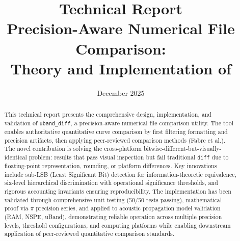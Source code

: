 \documentclass[11pt,letterpaper]{article}
\title{
    \textbf{Technical Report}\\
    \large Precision-Aware Numerical File Comparison:\\
    Theory and Implementation of \ubdiff{}
}
\author{}
\date{December 2025}
\newcommand{\ubdiff}{\texttt{uband\_diff}}
\begin{document}
\maketitle

\begin{abstract}
This technical report presents the comprehensive design, implementation, and validation of \ubdiff{}, a precision-aware numerical file comparison utility. The tool enables authoritative quantitative curve comparison by first filtering formatting and precision artifacts, then applying peer-reviewed comparison methods (Fabre et al.). The novel contribution is solving the cross-platform bitwise-different-but-visually-identical problem: results that pass visual inspection but fail traditional \texttt{diff} due to floating-point representation, rounding, or platform differences. Key innovations include sub-LSB (Least Significant Bit) detection for information-theoretic equivalence, six-level hierarchical discrimination with operational significance thresholds, and rigorous accounting invariants ensuring reproducibility. The implementation has been validated through comprehensive unit testing (50/50 tests passing), mathematical proof via $\pi$ precision series, and applied to acoustic propagation model validation (RAM, NSPE, uBand), demonstrating reliable operation across multiple precision levels, threshold configurations, and computing platforms while enabling downstream application of peer-reviewed quantitative comparison standards.
\end{abstract}

\tableofcontents
\newpage











% 
% 

\appendix


\end{document}
